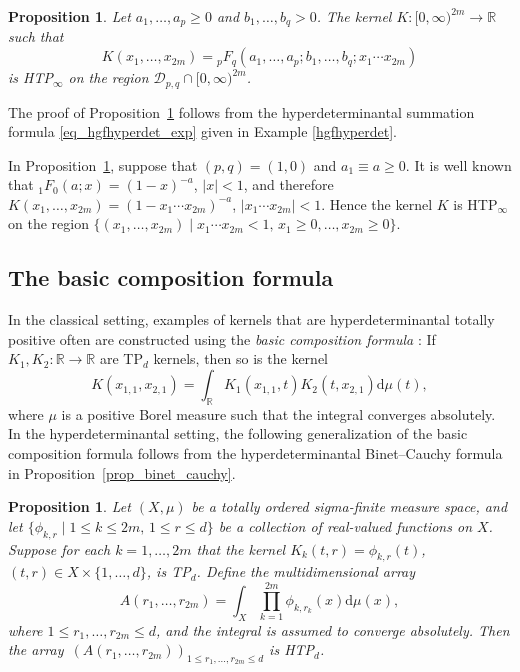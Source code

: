 \documentclass[10pt,a4paper]{amsart}
\numberwithin{equation}{section}
\newtheorem{Proposition}[Theorem]{Proposition}
 { \theoremstyle{definition}
\newtheorem{Definition}[Theorem]{Definition}
\newtheorem{Note}[Theorem]{Note}
\newtheorem{Example}[Theorem]{Example}
\newtheorem{Remark}[Theorem]{Remark} }
\def\R{{\mathbb R}}
\def\dd{ \mathrm{d}}
\def\mcalD{\mathcal{D}}
\begin{document}
\begin{Proposition}
\label{prop_hgfexample}
Let $a_1,\dots,a_p \ge 0$ and $b_1,\dots,b_q > 0$. The kernel $K\colon [0,\infty)^{2m} \to \R$ such that
\[
K(x_1,\dots,x_{2m}) = {}_pF_q(a_1,\dots,a_p;b_1,\dots,b_q;x_1\cdots x_{2m})
\]
is HTP$_\infty$ on the region $\mcalD_{p,q} \cap [0,\infty)^{2m}$.
\end{Proposition}

The proof of Proposition~\ref{prop_hgfexample} follows from the hyperdeterminantal summation formula \eqref{eq_hgfhyperdet_exp} given in Example \ref{hgfhyperdet}.

\begin{Example}
In Proposition~\ref{prop_hgfexample}, suppose that $(p,q)=(1,0)$ and $a_1 \equiv a \ge 0$. It is well known that ${}_1F_0(a;x) = (1-x)^{-a}$, $|x| < 1$, and therefore $K(x_1,\dots,x_{2m}) = (1 - x_1 \cdots x_{2m})^{-a}$, $|x_1\cdots x_{2m}| < 1$. Hence the kernel $K$ is HTP$_\infty$ on the region $\{(x_1,\dots,x_{2m})\mid x_1\cdots x_{2m} < 1,\, x_1 \ge 0,\dots,x_{2m} \ge 0\}$.
\end{Example}

\subsection{The basic composition formula}

In the classical setting, examples of kernels that are hyperdeterminantal totally positive often are constructed using the {\it basic composition formula} \cite{Karlin}: If $K_1, K_2 \colon \R \to \R$ are TP$_d$ kernels, then so is the kernel
\[
K(x_{1,1},x_{2,1}) = \int_\R K_1(x_{1,1},t) K_2(t,x_{2,1}) \dd\mu(t),
\]
where $\mu$ is a positive Borel measure such that the integral converges absolutely. In the hyperdeterminantal setting, the following generalization of the basic composition formula follows from the hyperdeterminantal Binet--Cauchy formula in Proposition~\ref{prop_binet_cauchy}.

\begin{Proposition}\label{prop_bcf}
Let $(X,\mu)$ be a totally ordered sigma-finite measure space, and let $\{\phi_{k,r}\mid 1 \le k \le 2m,\, 1 \le r \le d\}$ be a collection of real-valued functions on $X$. Suppose for each $k=1,\dots,2m$ that the kernel $K_k(t,r) = \phi_{k,r}(t)$, $(t,r) \in X \times \{1,\dots,d\}$, is TP$_d$. Define the multidimensional array
\[
A(r_1,\dots,r_{2m}) = \int_X \prod_{k=1}^{2m} \phi_{k,r_k}(x) \dd\mu(x),
\]
where $1 \le r_1,\dots,r_{2m} \le d$, and the integral is assumed to converge absolutely. Then the array~${(A(r_1,\dots,r_{2m}))_{1 \le r_1,\dots,r_{2m} \le d}}$ is HTP$_d$.
\end{Proposition}
\end{document}
